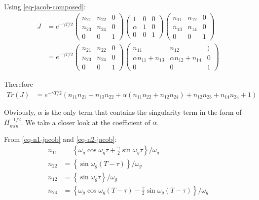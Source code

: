 \documentclass{book}
\renewcommand{\(}{\begin{columns}}
\renewcommand{\)}{\end{columns}}
\newcommand{\<}[1]{\begin{column}{#1}}
\renewcommand{\>}{\end{column}}
\begin{document}
Using \eqref{eq-jacob-composed}:
\begin{align}
\label{eq-ZDM-total}
J&=e^{-\gamma T/2}
\begin{pmatrix}
n_{21} & n_{22} & 0\\
n_{23} & n_{24} & 0\\
0 & 0 & 1
\end{pmatrix}
\begin{pmatrix}
1 & 0 & 0\\
\alpha & 1 & 0\\
0 & 0 & 1
\end{pmatrix}
\begin{pmatrix}
n_{11} & n_{12} & 0\\
n_{13} & n_{14} & 0\\
0 & 0 & 1
\end{pmatrix}\\
&=e^{-\gamma T/2}
\begin{pmatrix}
n_{21} & n_{22} & 0\\
n_{23} & n_{24} & 0\\
0 & 0 & 1
\end{pmatrix}
\begin{pmatrix}
n_{11} & n_{12} & )\\
\alpha n_{11}+n_{13} & \alpha n_{12}+n_{14} & 0\\
0 & 0 & 1
\end{pmatrix}
\end{align}

Therefore
\begin{align}
\label{eq-trace-ZDM}
Tr(J)&=e^{-\gamma T/2}(n_{11}n_{21}+n_{13}n_{22}+\alpha(n_{11}n_{22}+n_{12}n_{24})+n_{12}n_{23}+n_{14}n_{24}+1)
\end{align}

Obviously, $\alpha$ is the only term that contains the singularity term in the 
form of $H_{min}^{-1/2}$.  We take a closer look at the coefficient of $\alpha$.  

From \eqref{eq-n1-jacob} and \eqref{eq-n2-jacob}:
\begin{align}
n_{11}&=\left\{\omega_g\cos{\omega_g \tau}+\frac{\gamma}{2}\sin{\omega_g \tau} \right\}/\omega_g\\
n_{22}&=\left\{\sin{\omega_g (T-\tau)} \right\}/\omega_g\\
n_{12}&=\left\{\sin{\omega_g \tau} \right\}/\omega_g\\
n_{24}&=\left\{\omega_g\cos{\omega_g (T-\tau)}-\frac{\gamma}{2}\sin{\omega_g (T-\tau)} \right\}/\omega_g
\end{align}
\end{document}
